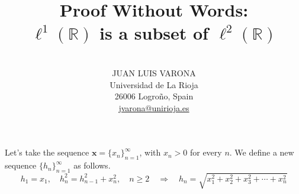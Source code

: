 \documentclass[10pt, a4paper]{article}
\title{\vspace*{-1cm}
\hfill \huge\bfseries\sffamily Proof Without Words:\\
\hfill \huge\bfseries\sffamily $\ell^1(\mathbb{R})$ is a subset of $\ell^2(\mathbb{R})$}
\author{\hspace*{\textwidth}\kern -7pt\\[-16pt]
\hfill \sffamily\sffamily\Large \uppercase{Juan Luis Varona}\\
\hfill \sffamily \small Universidad de La Rioja\\[-3pt]
\hfill \sffamily \small 26006 Logro\~no, Spain\\[-3pt]
\hfill \sffamily \small \href{mailto:jvarona@unirioja.es}{jvarona@unirioja.es}}
\date{}
\begin{document}

\maketitle

\thispagestyle{empty}


Let's take the sequence $\mathbf{x} = \{x_n\}_{n=1}^{\infty}$, with $x_n>0$ for every $n$.
We define a new sequence $\{h_n\}_{n=1}^{\infty}$ as follows.
\[
  h_1 = x_1, \quad h_{n}^2 = h_{n-1}^2  + x_{n}^2, \quad n \ge 2
  \quad\Rightarrow\quad
  h_n = \sqrt{x_1^2 + x_2^2 + x_3^2 + \cdots + x_n^2}
\]


\end{document}
